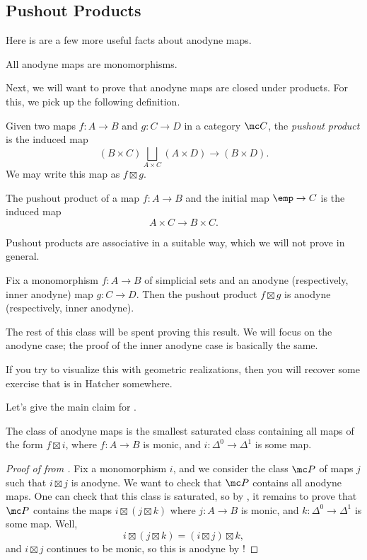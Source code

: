 \documentclass[../notes.tex]{subfiles}
\begin{document}
\subsection{Pushout Products}
Here is are a few more useful facts about anodyne maps.
\begin{remark}
	All anodyne maps are monomorphisms.
\end{remark}
Next, we will want to prove that anodyne maps are closed under products. For this, we pick up the following definition.
\begin{definition}
	Given two maps $f\colon A\to B$ and $g\colon C\to D$ in a category $\mc C$, the \textit{pushout product} is the induced map
	\[(B\times C)\bigsqcup_{A\times C}(A\times D)\to (B\times D).\]
	We may write this map as $f\boxtimes g$.
\end{definition}
\begin{example}
	The pushout product of a map $f\colon A\to B$ and the initial map $\emp\to C$ is the induced map
	\[A\times C\to B\times C.\]
\end{example}
\begin{remark}
	Pushout products are associative in a suitable way, which we will not prove in general.
\end{remark}
\begin{theorem} \label{thm:anodyne-pushout-product}
	Fix a monomorphism $f\colon A\to B$ of simplicial sets and an anodyne (respectively, inner anodyne) map $g\colon C\to D$. Then the pushout product $f\boxtimes g$ is anodyne (respectively, inner anodyne).
\end{theorem}
The rest of this class will be spent proving this result. We will focus on the anodyne case; the proof of the inner anodyne case is basically the same.
\begin{remark}
	If you try to visualize this with geometric realizations, then you will recover some exercise that is in Hatcher somewhere.
\end{remark}
Let's give the main claim for .
\begin{lemma} \label{lem:weird-anodyne}
	The class of anodyne maps is the smallest saturated class containing all maps of the form $f\boxtimes i$, where $f\colon A\to B$ is monic, and $i\colon\Delta^0\to\Delta^1$ is some map.
\end{lemma}
\begin{proof}[Proof of  from ]
	Fix a monomorphism $i$, and we consider the class $\mc P$ of maps $j$ such that $i\boxtimes j$ is anodyne. We want to check that $\mc P$ contains all anodyne maps. One can check that this class is saturated, so by , it remains to prove that $\mc P$ contains the maps $i\boxtimes(j\boxtimes k)$ where $j\colon A\to B$ is monic, and $k\colon\Delta^0\to\Delta^1$ is some map. Well,
	\[i\boxtimes(j\boxtimes k)=(i\boxtimes j)\boxtimes k,\]
	and $i\boxtimes j$ continues to be monic, so this is anodyne by !
\end{proof}
\end{document}
